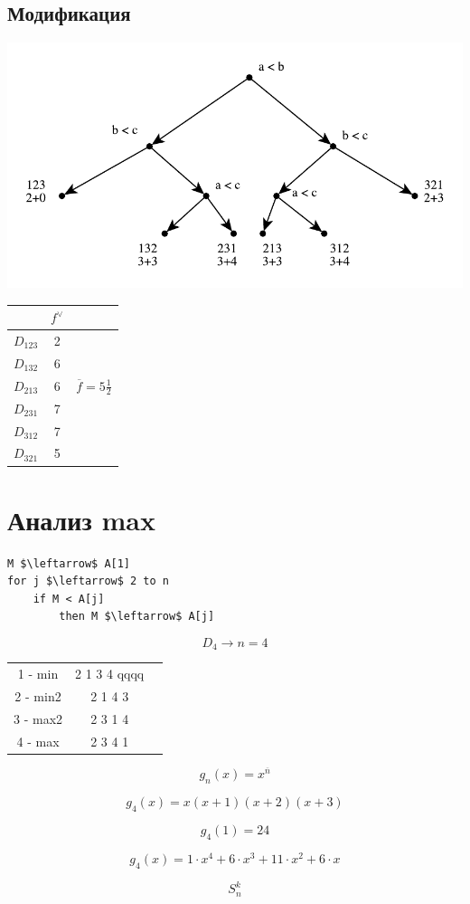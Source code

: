 \documentclass[a4paper, 14pt]{report}
\begin{document}
\subsection{Модификация}

\includegraphics{anal4}

\begin{tabular}{ccc}
              & $f^\vee$ & \\
    \hline
    $D_{123}$ & 2        & \\
    $D_{132}$ & 6        & \\
    $D_{213}$ & 6        & $\overline{f} = 5 \frac{1}{2}$\\
    $D_{231}$ & 7        & \\
    $D_{312}$ & 7        & \\
    $D_{321}$ & 5        & \\
\end{tabular}

\section{Анализ max}

\begin{lstlisting}
M $\leftarrow$ A[1]
for j $\leftarrow$ 2 to n
    if M < A[j]
        then M $\leftarrow$ A[j]
\end{lstlisting}

$$
D_4 \to n = 4
$$

\begin{tabular}{ccc}
    1 - min  & 2 1 3 4 qqqq\\
    2 - min2 & 2 1 4 3 \\
    3 - max2 & 2 3 1 4 \\
    4 - max  & 2 3 4 1 \\
\end{tabular}

$$
g_n(x) = x^{\overline{n}}
$$

$$
g_4(x) = x(x+1)(x+2)(x+3)
$$

$$
g_4(1) = 24
$$

$$
g_4(x) = 1 \cdot x^4 + 6 \cdot x^3 + 11 \cdot x^2 + 6 \cdot x
$$

$$
S_n^k
$$
\end{document}

